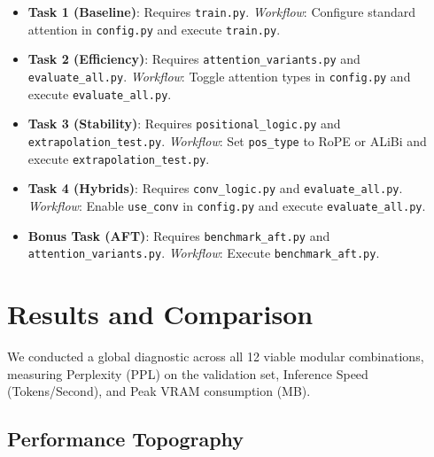 \documentclass[11pt,a4paper]{article}
\begin{document}
\begin{itemize}
    \item \textbf{Task 1 (Baseline)}: Requires \texttt{train.py}. \textit{Workflow}: Configure standard attention in \texttt{config.py} and execute \texttt{train.py}.
    \item \textbf{Task 2 (Efficiency)}: Requires \texttt{attention\_variants.py} and \texttt{evaluate\_all.py}. \textit{Workflow}: Toggle attention types in \texttt{config.py} and execute \texttt{evaluate\_all.py}.
    \item \textbf{Task 3 (Stability)}: Requires \texttt{positional\_logic.py} and \texttt{extrapolation\_test.py}. \textit{Workflow}: Set \texttt{pos\_type} to RoPE or ALiBi and execute \texttt{extrapolation\_test.py}.
    \item \textbf{Task 4 (Hybrids)}: Requires \texttt{conv\_logic.py} and \texttt{evaluate\_all.py}. \textit{Workflow}: Enable \texttt{use\_conv} in \texttt{config.py} and execute \texttt{evaluate\_all.py}.
    \item \textbf{Bonus Task (AFT)}: Requires \texttt{benchmark\_aft.py} and \texttt{attention\_variants.py}. \textit{Workflow}: Execute \texttt{benchmark\_aft.py}.
\end{itemize}

\section{Results and Comparison}

We conducted a global diagnostic across all 12 viable modular combinations, measuring Perplexity (PPL) on the validation set, Inference Speed (Tokens/Second), and Peak VRAM consumption (MB).

\subsection{Performance Topography}
\end{document}
